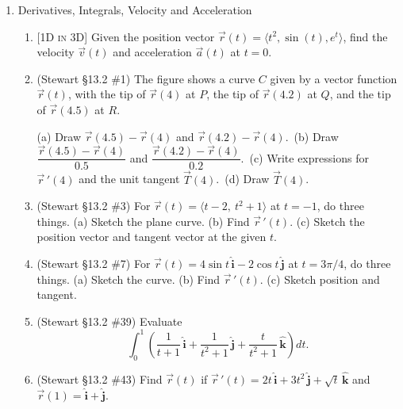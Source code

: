 \documentclass[12pt]{article}
\newcommand{\ihat}{\hat{\textbf{i}}}
\newcommand{\jhat}{\hat{\textbf{j}}}
\newcommand{\khat}{\hat{\textbf{k}}}
\newcommand{\dimtag}[1]{{\footnotesize\textsc{[#1]}}\;}
\begin{document}
\begin{enumerate}
\item Derivatives, Integrals, Velocity and Acceleration
    \begin{enumerate}
        \item \dimtag{1D in 3D} Given the position vector $\vec{r}(t) = \langle t^2, \sin(t), e^t \rangle$, find the velocity $\vec{v}(t)$ and acceleration $\vec{a}(t)$ at $t = 0$.
        \item (Stewart \S13.2 \#1) The figure shows a curve $C$ given by a vector function $\vec r(t)$, with the tip of $\vec r(4)$ at $P$, the tip of $\vec r(4.2)$ at $Q$, and the tip of $\vec r(4.5)$ at $R$.
        \begin{center}
        \end{center}
        (a) Draw $\vec r(4.5)-\vec r(4)$ and $\vec r(4.2)-\vec r(4)$.\
        (b) Draw $\dfrac{\vec r(4.5)-\vec r(4)}{0.5}$ and $\dfrac{\vec r(4.2)-\vec r(4)}{0.2}$.\
        (c) Write expressions for $\vec r\,'(4)$ and the unit tangent $\vec T(4)$.\
        (d) Draw $\vec T(4)$.
        \item (Stewart \S13.2 \#3) For $\vec r(t) = \langle t - 2,\ t^2 + 1\rangle$ at $t = -1$, do three things. (a) Sketch the plane curve. (b) Find $\vec r\,'(t)$. (c) Sketch the position vector and tangent vector at the given $t$.
        \item (Stewart \S13.2 \#7) For $\vec r(t) = 4\sin t\,\ihat - 2\cos t\,\jhat$ at $t = 3\pi/4$, do three things. (a) Sketch the curve. (b) Find $\vec r\,'(t)$. (c) Sketch position and tangent.
        \item (Stewart \S13.2 \#39) Evaluate
        \[ \int_0^1 \left( \frac{1}{t+1}\,\ihat + \frac{1}{t^2+1}\,\jhat + \frac{t}{t^2+1}\,\khat \right) dt. \]
        \item (Stewart \S13.2 \#43) Find $\vec r(t)$ if $\vec r\,'(t) = 2t\,\ihat + 3t^2\,\jhat + \sqrt{t}\,\khat$ and $\vec r(1) = \ihat + \jhat$.

\end{enumerate}
\end{enumerate}
\end{document}

